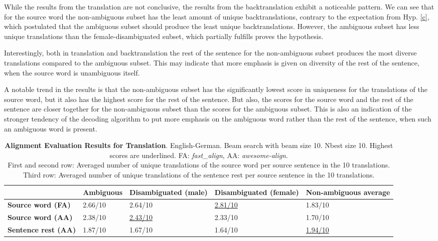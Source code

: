 
While the results from the translation are not conclusive, the results from the backtranslation exhibit a noticeable pattern. We can see that for the source word the non-ambiguous subset has the least amount of unique backtranslations, contrary to the expectation from Hyp. \ref{c}, which postulated that the ambiguous subset should produce the least unique backtranslations. However, the ambiguous subset has less unique translations than the female-disambiguated subset, which partially fulfills proves the hypothesis. 

Interestingly, both in translation and backtranslation the rest of the sentence for the non-ambiguous subset produces the most diverse translations compared to the ambiguous subset. This may indicate that more emphasis is given on diversity of the rest of the sentence, when the source word is unambiguous itself.

A notable trend in the results is that the non-ambiguous subset has the significantly lowest score in uniqueness for the translations of the source word, but it also has the highest score for the rest of the sentence. But also, the scores for the source word and the rest of the sentence are closer together for the non-ambiguous subset than the scores for the ambiguous subset. This is also an indication of the stronger tendency of the decoding algorithm to put more emphasis on the ambiguous word rather than the rest of the sentence, when such an ambiguous word is present.


\begin{table} 
    \label{tab:alignment_translation}
    \begin{tabularx}{\linewidth}{|X|XXXX|}
        \hline
         & \textbf{Ambiguous} & \textbf{Disambiguated (male)} & \textbf{Disambiguated (female)} & \textbf{Non-ambiguous average} \\ \hline
         \textbf{Source word (FA)} & 2.66/10 & 2.64/10 & \underline{2.81/10} & 1.83/10 \\ 
         \textbf{Source word (AA)} & 2.38/10 & \underline{2.43/10} & 2.33/10 & 1.70/10 \\ \hline 
         \textbf{Sentence rest (AA)} & 1.87/10 & 1.67/10 & 1.64/10 & \underline{1.94/10} \\ \hline
    \end{tabularx}
    \caption{\textbf{Alignment Evaluation Results for Translation}. English-German. Beam search with beam size 10. Nbest size 10. Highest scores are underlined. FA: \textit{fast\_align}, AA: \textit{awesome-align}. \\ First and second row: Averaged number of unique translations of the source word per source sentence in the 10 translations. \\ Third row: Averaged number of unique translations of the sentence rest per source sentence in the 10 translations.}
\end{table}

